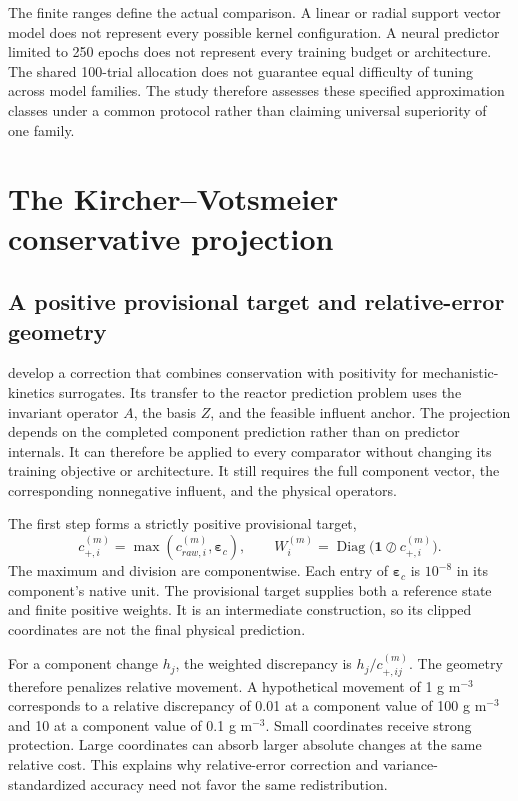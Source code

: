 The finite ranges define the actual comparison. A linear or radial support vector model does not represent every possible kernel configuration. A neural predictor limited to 250 epochs does not represent every training budget or architecture. The shared 100-trial allocation does not guarantee equal difficulty of tuning across model families. The study therefore assesses these specified approximation classes under a common protocol rather than claiming universal superiority of one family.

\section{The Kircher--Votsmeier conservative projection}

\subsection{A positive provisional target and relative-error geometry}

\citet{KircherVotsmeier2025} develop a correction that combines conservation with positivity for mechanistic-kinetics surrogates. Its transfer to the reactor prediction problem uses the invariant operator $A$, the basis $Z$, and the feasible influent anchor. The projection depends on the completed component prediction rather than on predictor internals. It can therefore be applied to every comparator without changing its training objective or architecture. It still requires the full component vector, the corresponding nonnegative influent, and the physical operators.

The first step forms a strictly positive provisional target,
\begin{equation}
c_{+,i}^{(m)}=\max(c_{raw,i}^{(m)},\boldsymbol{\varepsilon}_c),\qquad
W_i^{(m)}=\operatorname{Diag}\bigl(\mathbf{1}\oslash c_{+,i}^{(m)}\bigr).
\label{eq:projection_positive_target}
\end{equation}
The maximum and division are componentwise. Each entry of $\boldsymbol{\varepsilon}_c$ is $10^{-8}$ in its component's native unit. The provisional target supplies both a reference state and finite positive weights. It is an intermediate construction, so its clipped coordinates are not the final physical prediction.

For a component change $h_j$, the weighted discrepancy is $h_j/c_{+,ij}^{(m)}$. The geometry therefore penalizes relative movement. A hypothetical movement of 1 g m$^{-3}$ corresponds to a relative discrepancy of 0.01 at a component value of 100 g m$^{-3}$ and 10 at a component value of 0.1 g m$^{-3}$. Small coordinates receive strong protection. Large coordinates can absorb larger absolute changes at the same relative cost. This explains why relative-error correction and variance-standardized accuracy need not favor the same redistribution.

